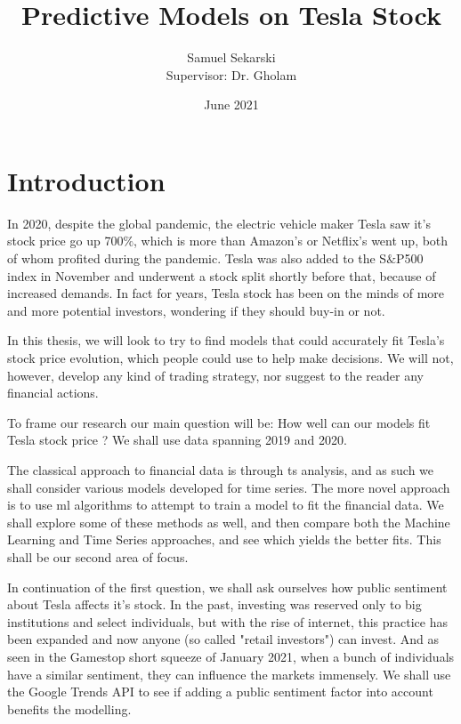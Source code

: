 \documentclass[10pt]{report}
\title{Predictive Models on Tesla Stock}
\author{Samuel Sekarski \\ Supervisor: Dr. Gholam}
\date{June 2021}
\begin{document}
\maketitle

\tableofcontents
\listoffigures

\chapter{Introduction}
In 2020, despite the global pandemic, the electric vehicle maker Tesla saw it's stock price go up 700$\%$, which is more than Amazon's or Netflix's went up, both of whom profited during the pandemic. Tesla was also added to the S$\&$P500 index in November and underwent a stock split shortly before that, because of increased demands. In fact for years, Tesla stock has been on the minds of more and more potential investors, wondering if they should buy-in or not.

In this thesis, we will look to try to find models that could accurately fit Tesla's stock price evolution, which people could use to help make decisions. We will not, however, develop any kind of trading strategy, nor suggest to the reader any financial actions.

To frame our research our main question will be: How well can our models fit Tesla stock price ?
We shall use data spanning 2019 and 2020.

The classical approach to financial data is through \acrfull{ts} analysis, and as such we shall consider various models developed for time series. The more novel approach is to use \acrfull{ml} algorithms to attempt to train a model to fit the financial data. We shall explore some of these methods as well, and then compare both the Machine Learning and Time Series approaches, and see which yields the better fits. This shall be our second area of focus.

In continuation of the first question, we shall ask ourselves how public sentiment about Tesla affects it's stock. In the past, investing was reserved only to big institutions and select individuals, but with the rise of internet, this practice has been expanded and now anyone (so called "retail investors") can invest. And as seen in the Gamestop short squeeze of January 2021, when a bunch of individuals have a similar sentiment, they can influence the markets immensely. We shall use the Google Trends API to see if adding a public sentiment factor into account benefits the modelling.
\end{document}
